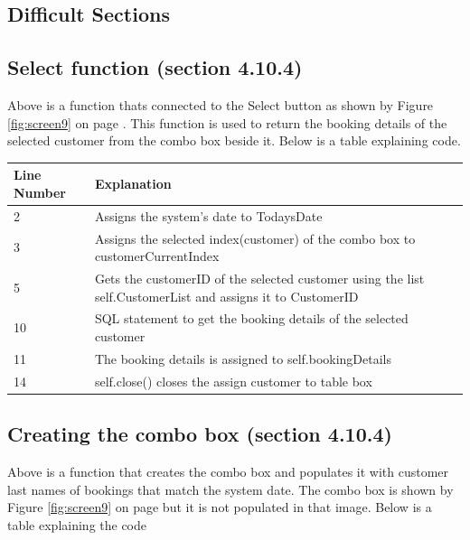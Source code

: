 \subsection{Difficult Sections}

\newpage
\subsection{Select function (section 4.10.4)}

Above is a function thats connected to the Select button as shown by Figure \ref{fig:screen9} on page \pageref{fig:screen9}. This function is used to return the booking details of the selected customer from the combo box beside it. Below is a table explaining code.


\begin{center}
\begin{tabular}{|p{5cm}|p{7.5cm}|}
\hline
\textbf{Line Number} & \textbf{Explanation} \\ \hline
2 & Assigns the system's date to TodaysDate \\ \hline
3 & Assigns the selected index(customer) of the combo box to customerCurrentIndex \\ \hline
5 & Gets the customerID of the selected customer using the list self.CustomerList and assigns it to CustomerID \\ \hline
10 & SQL statement to get the booking details of the selected customer  \\ \hline
11 & The booking details is assigned to self.bookingDetails \\ \hline
14 & self.close() closes the assign customer to table box \\ \hline

\end{tabular}
\end{center}
\newpage
\subsection{Creating the combo box (section 4.10.4)}

Above is a function that creates the combo box and populates it with customer last names of bookings that match the system date. The combo box is shown by Figure \ref{fig:screen9} on page \pageref{fig:screen9} but it is not populated in that image. Below is a table explaining the code

